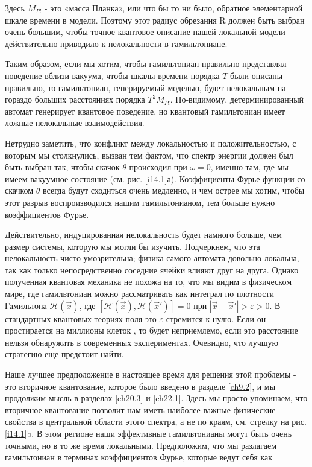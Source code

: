 \documentclass[main.tex]{subfiles}
\begin{document}
 
Здесь $M_{Pl}$ - это «масса Планка», или что бы то ни было, обратное элементарной шкале времени в модели. Поэтому этот радиус обрезания R должен быть выбран очень большим, чтобы точное квантовое описание нашей локальной модели действительно приводило к нелокальности в гамильтониане.

Таким образом, если мы хотим, чтобы гамильтониан правильно представлял поведение вблизи вакуума, чтобы шкалы времени порядка $T$ были описаны правильно, то гамильтониан, генерируемый моделью, будет нелокальным на гораздо больших расстояниях порядка $T^2M_{Pl}$. По-видимому, детерминированный автомат генерирует квантовое поведение, но квантовый гамильтониан имеет ложные нелокальные взаимодействия.

Нетрудно заметить, что конфликт между локальностью и положительностью, с которым мы столкнулись, вызван тем фактом, что спектр энергии должен был быть выбран так, чтобы скачок $\theta$ происходил при $\omega = 0$, именно там, где мы имеем вакуумное состояние (см. рис. \ref{i14.1}а). Коэффициенты Фурье функции со скачком $\theta$ всегда будут сходиться очень медленно, и чем острее мы хотим, чтобы этот разрыв воспроизводился нашим гамильтонианом, тем больше нужно коэффициентов Фурье. 

Действительно, индуцированная нелокальность будет намного больше, чем размер системы, которую мы могли бы изучить. Подчеркнем, что эта нелокальность чисто умозрительна; физика самого автомата довольно локальна, так как только непосредственно соседние ячейки влияют друг на друга. Однако полученная квантовая механика не похожа на то, что мы видим в физическом мире, где гамильтониан можно рассматривать как интеграл по плотности Гамильтона $\mathcal H (\vec x)$, где $\left[\mathcal H (\vec x),\mathcal H (\vec x')\right] = 0$ при $| \vec x - \vec x'| > \varepsilon > 0$. В стандартных квантовых теориях поля это $\varepsilon$ стремится к нулю. Если он простирается на миллионы клеток , то  будет неприемлемо, если это расстояние нельзя обнаружить в современных экспериментах. Очевидно, что лучшую стратегию еще предстоит найти.

Наше лучшее предположение в настоящее время для решения этой проблемы - это вторичное квантование, которое было введено в разделе \ref{ch9.2}, и мы продолжим мысль в разделах \ref{ch20.3} и \ref{ch22.1}. Здесь мы просто упоминаем, что вторичное квантование позволит нам иметь наиболее важные физические свойства в центральной области этого спектра, а не по краям, см. стрелку на рис. \ref{i14.1}b. В этом регионе наши эффективные гамильтонианы могут быть очень точными, но в то же время локальными. Предположим, что мы разлагаем гамильтониан в терминах коэффициентов Фурье, которые ведут себя как
\end{document}
